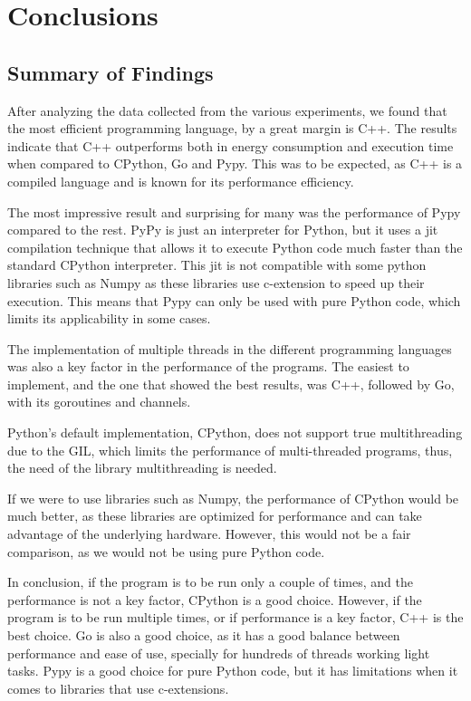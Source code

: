 \chapter{Conclusions}\label{chap:conclusions}


\section{Summary of Findings}
After analyzing the data collected from the various experiments, we found that the most efficient programming language, by a great margin is C++. The results indicate that C++ outperforms both in energy consumption and execution time when compared to \gls{CPython}, Go and Pypy. This was to be expected, as C++ is a compiled language and is known for its performance efficiency.

The most impressive result and surprising for many was the performance of Pypy compared to the rest. PyPy is just an interpreter for Python, but it uses a \gls{jit} compilation technique that allows it to execute Python code much faster than the standard \gls{CPython} interpreter. This \gls{jit} is not compatible with some python libraries such as Numpy \cite{numpy} as these libraries use \gls{c-extension} to speed up their execution. This means that Pypy can only be used with pure Python code, which limits its applicability in some cases.

The implementation of multiple threads in the different programming languages was also a key factor in the performance of the programs. The easiest to implement, and the one that showed the best results, was C++, followed by Go, with its \glspl{goroutine} and \glspl{channel}. 

Python's default implementation, \gls{CPython}, does not support true multithreading due to the \gls{GIL}, which limits the performance of multi-threaded programs, thus, the need of the library multithreading is needed.

If we were to use libraries such as Numpy, the performance of \gls{CPython} would be much better, as these libraries are optimized for performance and can take advantage of the underlying hardware. However, this would not be a fair comparison, as we would not be using pure Python code.

In conclusion, if the program is to be run only a couple of times, and the performance is not a key factor, \gls{CPython} is a good choice. However, if the program is to be run multiple times, or if performance is a key factor, C++ is the best choice. Go is also a good choice, as it has a good balance between performance and ease of use, specially for hundreds of threads working light tasks. Pypy is a good choice for pure Python code, but it has limitations when it comes to libraries that use \glspl{c-extension}.

